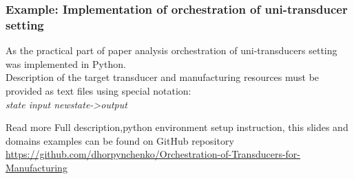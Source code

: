 \documentclass{beamer}
\theoremstyle{definition}
\theoremstyle{plain}
\begin{document}
\begin{frame}
\frametitle{Example: Implementation of orchestration of uni-transducer setting}
As the practical part of paper analysis orchestration of uni-transducers setting was implemented in Python.
\\
\vspace{0.4cm}
Description of the target transducer and manufacturing resources must be provided as text files using special notation:
\\
\textit{state input newstate->output}
\\
\begin{block}{Read more}
Full description,python environment setup instruction, this slides and domains examples can be found on GitHub repository \url{https://github.com/dhorpynchenko/Orchestration-of-Transducers-for-Manufacturing}
\end{block}
\end{frame}
\end{document}
